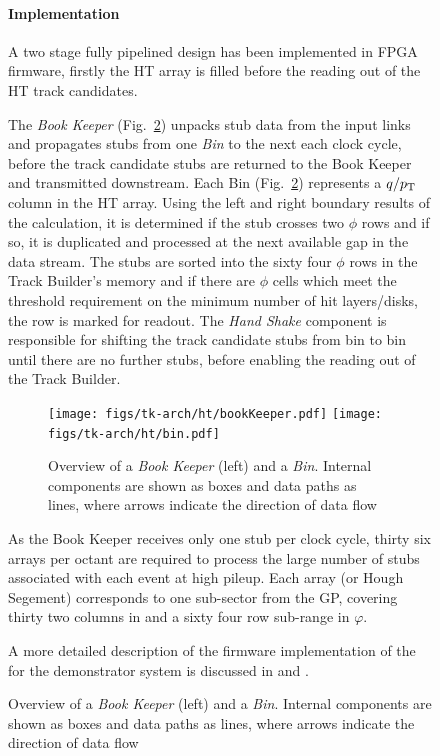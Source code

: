 \begin{figure}[tb]
\paragraph{Implementation}
A two stage fully pipelined design has been implemented in FPGA firmware, firstly the HT array is filled before the reading out of the HT track candidates. 

The \textit{Book Keeper} (Fig.~\ref{fig:implementationHT}) unpacks stub data from the input links and propagates stubs from one \textit{Bin} to the next each clock cycle, before the track candidate stubs are returned to the Book Keeper and transmitted downstream. 
Each Bin (Fig.~\ref{fig:implementationHT}) represents a $q/p_{\mathrm{T}}$ column in the HT array. 
Using the left and right boundary results of the \HT calculation, it is determined if the stub crosses two $\phi$ rows and if so, it is duplicated and processed at the next available gap in the data stream. 
The stubs are sorted into the sixty four $\phi$ rows in the Track Builder's memory and if there are $\phi$ cells which meet the threshold requirement on the minimum number of hit layers/disks, the row is marked for readout. 
The \textit{Hand Shake} component is responsible for shifting the track candidate stubs from bin to bin until there are no further stubs, before enabling the reading out of the Track Builder.

\begin{figure}[!t]
\centering
\texttt{[image: figs/tk-arch/ht/bookKeeper.pdf]}
\texttt{[image: figs/tk-arch/ht/bin.pdf]}
\caption{Overview of a \textit{Book Keeper} (left) and a \textit{Bin}. Internal components are shown as boxes and data paths as lines, where arrows indicate the direction of data flow}
\label{fig:implementationHT}
\end{figure}

As the Book Keeper receives only one stub per clock cycle, thirty six arrays per octant are required to process the large number of stubs associated with each event at high pileup.
Each array (or Hough Segement) corresponds to one sub-sector from the GP, covering thirty two columns in \qpt and a sixty four row sub-range in $\varphi$.

A more detailed description of the firmware implementation of the \HT for the demonstrator system is discussed in \cite{IEEE} and \cite{TmttNote}.


\end{figure}
